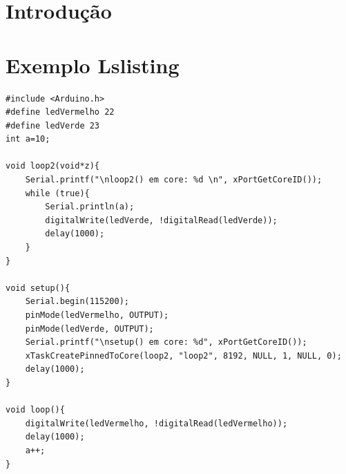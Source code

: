 \documentclass[a4paper, 12pt]{article}
\begin{document}
\newpage
\newpage
\tableofcontents
\thispagestyle{empty}

\newpage
{}
\listoffigures
\newpage
\listoftables
\newpage
\lstlistoflistings
\newpage

\section{Introdução}
\newpage
\section{Exemplo Lslisting}

\begin{lstlisting}[label=Multiprocessamento,caption=Multiprocessamento]
#include <Arduino.h>
#define ledVermelho 22
#define ledVerde 23
int a=10;

void loop2(void*z){
    Serial.printf("\nloop2() em core: %d \n", xPortGetCoreID());
    while (true){
        Serial.println(a);
        digitalWrite(ledVerde, !digitalRead(ledVerde));
        delay(1000);
    }
}

void setup(){
    Serial.begin(115200);
    pinMode(ledVermelho, OUTPUT);
    pinMode(ledVerde, OUTPUT);
    Serial.printf("\nsetup() em core: %d", xPortGetCoreID());
    xTaskCreatePinnedToCore(loop2, "loop2", 8192, NULL, 1, NULL, 0);
    delay(1000);
}

void loop(){
    digitalWrite(ledVermelho, !digitalRead(ledVermelho));
    delay(1000);
    a++;
}
\end{lstlisting}

\newpage



%

\end{document}
